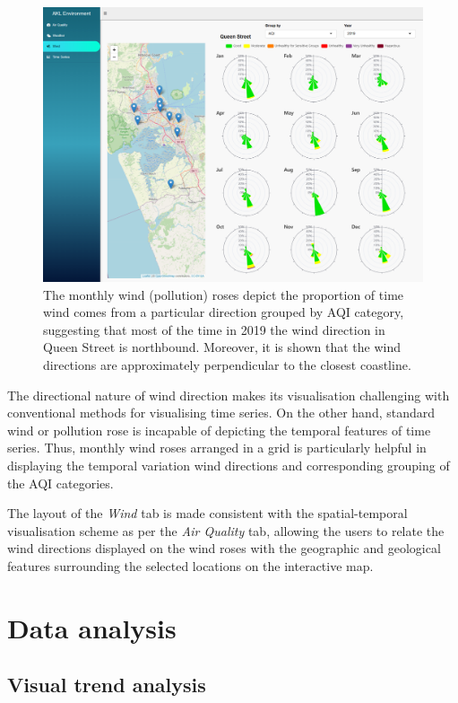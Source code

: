 \documentclass{aucklandthesis}
\begin{document}
\begin{figure}
\includegraphics[width=1\linewidth]{figures/wind-tab} \caption{The monthly wind (pollution) roses depict the proportion of time wind comes from a particular direction grouped by AQI category, suggesting that most of the time in 2019 the wind direction in Queen Street is northbound. Moreover, it is shown that the wind directions are approximately perpendicular to the closest coastline.}\label{fig:unnamed-chunk-4}
\end{figure}



The directional nature of wind direction makes its visualisation challenging with conventional methods for visualising time series. On the other hand, standard wind or pollution rose is incapable of depicting the temporal features of time series. Thus, monthly wind roses arranged in a grid is particularly helpful in displaying the temporal variation wind directions and corresponding grouping of the AQI categories.

The layout of the \emph{Wind} tab is made consistent with the spatial-temporal visualisation scheme as per the \emph{Air Quality} tab, allowing the users to relate the wind directions displayed on the wind roses with the geographic and geological features surrounding the selected locations on the interactive map.

\hypertarget{data-analysis}{%
\section{Data analysis}\label{data-analysis}}

\hypertarget{sec:trend-viz}{%
\subsection{Visual trend analysis}\label{sec:trend-viz}}
\end{document}
